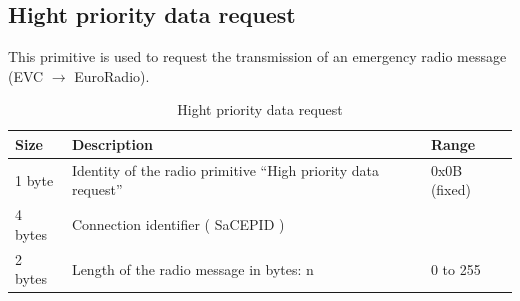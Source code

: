 \documentclass[nocc]{template/openetcs_report}
\begin{document}
\subsection{Hight priority data request}
This primitive is used to request the transmission of an emergency radio message (EVC $\rightarrow$ EuroRadio).
 			\begin{longtable}{|l|l|l|}
				\caption{Hight priority data request}\\ 
				\hline
				
					\begin{minipage}[t]{0.1\linewidth} \textbf{Size}	\end{minipage}
				&	\begin{minipage}[t]{0.5\linewidth} \textbf{Description}	\end{minipage}
				&	\begin{minipage}[t]{0.3\linewidth} \textbf{Range} \end{minipage} \\
				
				\hline
					 \begin{minipage}[t]{0.1\linewidth}1 byte \end{minipage}
					&\begin{minipage}[t]{0.6\linewidth}Identity of the radio primitive "`High priority data request"'	\end{minipage}
					&\begin{minipage}[t]{0.3\linewidth}0x0B (fixed) \end{minipage} \\
					
				\hline
					 \begin{minipage}[t]{0.1\linewidth}4 bytes \end{minipage}
					&\begin{minipage}[t]{0.6\linewidth}Connection identifier ( SaCEPID )	\end{minipage}
					&\begin{minipage}[t]{0.3\linewidth} \end{minipage} \\
					
				\hline
					 \begin{minipage}[t]{0.1\linewidth}2 bytes \end{minipage}
					&\begin{minipage}[t]{0.6\linewidth}Length of the radio message in bytes: n	\end{minipage}
					&\begin{minipage}[t]{0.3\linewidth}0 to 255 \end{minipage} \\
					

\end{longtable}
\end{document}
